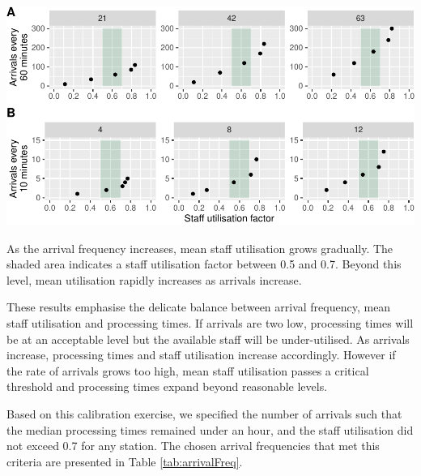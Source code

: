 \documentclass{article}
\let\origfigure\figure
\let\endorigfigure\endfigure
\renewenvironment{figure}[1][2] {
    \expandafter\origfigure\expandafter[H]
} {
    \endorigfigure
}
\begin{document}
\begin{figure}

{\centering \includegraphics{Preprint_files/figure-latex/staffUtilisation-1} 

}

\caption{Average staff utilisation by arrival frequency for a mass vaccination hub (A) and a GP vaccination clinic (B)}\label{fig:staffUtilisation}
\end{figure}

As the arrival frequency increases, mean staff utilisation grows
gradually. The shaded area indicates a staff utilisation factor between
0.5 and 0.7. Beyond this level, mean utilisation rapidly increases as
arrivals increase.

These results emphasise the delicate balance between arrival frequency,
mean staff utilisation and processing times. If arrivals are two low,
processing times will be at an acceptable level but the available staff
will be under-utilised. As arrivals increase, processing times and staff
utilisation increase accordingly. However if the rate of arrivals grows
too high, mean staff utilisation passes a critical threshold and
processing times expand beyond reasonable levels.

Based on this calibration exercise, we specified the number of arrivals
such that the median processing times remained under an hour, and the
staff utilisation did not exceed 0.7 for any station. The chosen arrival
frequencies that met this criteria are presented in Table
\ref{tab:arrivalFreq}.
\end{document}
